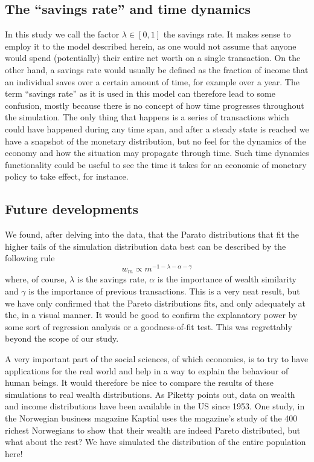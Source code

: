 \documentclass[10pt, a4paper]{amsart}
\begin{document}
\subsection{The ``savings rate'' and time dynamics}
In this study we call the factor $\lambda \in [0,1]$ the savings rate. It makes sense to employ it to the model described herein, as one would not assume that anyone would spend (potentially) their entire net worth on a single transaction. On the other hand, a savings rate would usually be defined as the fraction of income that an individual saves over a certain amount of time, for example over a year. The term ``savings rate'' as it is used in this model can therefore lead to some confusion, mostly because there is no concept of how time progresses throughout the simulation. The only thing that happens is a series of transactions which could have happened during any time span, and after a steady state is reached we have a snapshot of the monetary distribution, but no feel for the dynamics of the economy and how the situation may propagate through time. Such time dynamics functionality could be useful to see the time it takes for an economic of monetary policy to take effect, for instance.

\subsection{Future developments}

We found, after delving into the data, that the Parato distributions that fit the higher tails of the simulation distribution data best can be described by the following rule
\begin{equation}
\label{eq:ourpareto}
w_m \propto m^{-1-\lambda-\alpha-\gamma}
\end{equation}
where, of course, $\lambda$ is the savings rate, $\alpha$ is the importance of wealth similarity and $\gamma$ is the importance of previous transactions. This is a very neat result, but we have only confirmed that the Pareto distributions fits, and only adequately at the, in a visual manner. It would be good to confirm the explanatory power by some sort of regression analysis or a goodness-of-fit test. This was regrettably beyond the scope of our study.

A very important part of the social sciences, of which economics, is to try to have applications for the real world and help in a way to explain the behaviour of human beings. It would therefore be nice to compare the results of these simulations to real wealth distributions. As Piketty points out\cite{Piketty}, data on wealth and income distributions have been available in the US since 1953. One study\cite{Kjersti}, in the Norwegian business magazine Kaptial uses the magazine's study of the 400 richest Norwegians to show that their wealth are indeed Pareto distributed, but what about the rest? We have simulated the distribution of the entire population here! 
\end{document}
